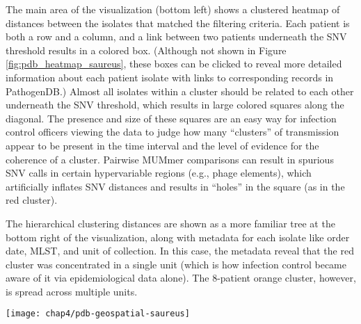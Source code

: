 The main area of the visualization (bottom left) shows a clustered heatmap of distances between the isolates that matched the filtering criteria. Each patient is both a row and a column, and a link between two patients underneath the SNV threshold results in a colored box. (Although not shown in Figure \ref{fig:pdb_heatmap_saureus}, these boxes can be clicked to reveal more detailed information about each patient isolate with links to corresponding records in PathogenDB.) Almost all isolates within a cluster should be related to each other underneath the SNV threshold, which results in large colored squares along the diagonal. The presence and size of these squares are an easy way for infection control officers viewing the data to judge how many ``clusters'' of transmission appear to be present in the time interval and the level of evidence for the coherence of a cluster. Pairwise MUMmer comparisons can result in spurious SNV calls in certain hypervariable regions (e.g., phage elements), which artificially inflates SNV distances and results in ``holes'' in the square (as in the red cluster).

The hierarchical clustering distances are shown as a more familiar tree at the bottom right of the visualization, along with metadata for each isolate like order date, MLST, and unit of collection. In this case, the metadata reveal that the red cluster was concentrated in a single unit (which is how infection control became aware of it via epidemiological data alone). The 8-patient orange cluster, however, is spread across multiple units.

\begin{sidewaysfigure}[hp]
  \sidewaysvspace
  \centering
  \texttt{[image: chap4/pdb-geospatial-saureus]}               
\end{sidewaysfigure}

